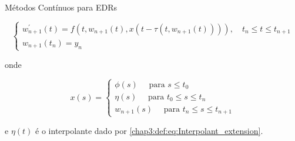 \documentclass{beamer}
\theoremstyle{plain}
\theoremstyle{definition}
\begin{document}

\begin{frame}{Métodos Contínuos para EDRs}


    \begin{equation}
        \left\{\begin{array}{l}
                w_{n+1}^{\prime}(t)=f(t, w_{n+1}(t), x(t-\tau(t, w_{n+1}(t)))), \quad t_{n} \leq t \leq t_{n+1} \\
                w_{n+1}(t_{n})=y_{n}
        \end{array}\right.
        \label{chap3:sec:2:eq:1}
    \end{equation}

    onde

    $$
    x(s)=\left\{\begin{array}{l}
            \phi(s) \quad \text { para } s \leq t_{0} \\
            \eta(s) \quad \text { para } t_{0} \leq s \leq t_{n} \\
            w_{n+1}(s) \quad \text { para } t_{n} \leq s \leq t_{n+1}
    \end{array}\right.
    $$

    e \(\eta(t)\) é o interpolante dado por \ref{chap3:def:eq:Interpolant_extension}. 

\end{frame}


\end{document}
